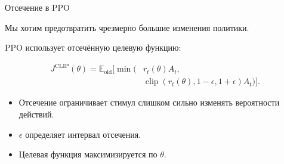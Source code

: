 \documentclass{beamer}
\begin{document}
	\begin{frame}{Отсечение в PPO}
		\begin{flushleft}
			
			Мы хотим предотвратить чрезмерно большие изменения политики.
			
			PPO использует отсечённую целевую функцию:
			
			\[
			\boxed{
				\begin{aligned}
					J^{\mathrm{CLIP}}(\theta)
					=
					\mathbb{E}_{\mathrm{old}}
					\Big[
					\min\big(&r_t(\theta)A_t,\\
					&\operatorname{clip}
					(r_t(\theta),1-\epsilon,1+\epsilon)A_t
					\big)
					\Big].
				\end{aligned}
			}
			\]
			
			\begin{itemize}
				\item Отсечение ограничивает стимул слишком сильно изменять
				вероятности действий.
				\item $\epsilon$ определяет интервал отсечения.
				\item Целевая функция максимизируется по $\theta$.
			\end{itemize}
			
		\end{flushleft}
	\end{frame}
\end{document}
